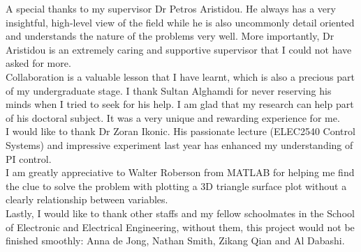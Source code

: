 A special thanks to my supervisor Dr Petros Aristidou. He always has a very insightful, high-level view of the field while he is also uncommonly detail oriented and understands the nature of the problems very well. More importantly, Dr Aristidou is an extremely caring and supportive supervisor that I could not have asked for more.\\

Collaboration is a valuable lesson that I have learnt, which is also a precious part of my undergraduate stage. I thank Sultan Alghamdi for never reserving his minds when I tried to seek for his help. I am glad that my research can help part of his doctoral subject. It was a very unique and rewarding experience for me.\\

I would like to thank Dr Zoran Ikonic. His passionate lecture (ELEC2540 Control Systems) and impressive experiment last year has enhanced my understanding of PI control.\\

I am greatly appreciative to Walter Roberson from MATLAB for helping me find the clue to solve the problem with plotting a 3D triangle surface plot without a clearly relationship between variables.\\

Lastly, I would like to thank other staffs and my fellow schoolmates in the School of Electronic and Electrical Engineering, without them, this project would not be finished smoothly: Anna de Jong, Nathan Smith, Zikang Qian and Al Dabashi.\\